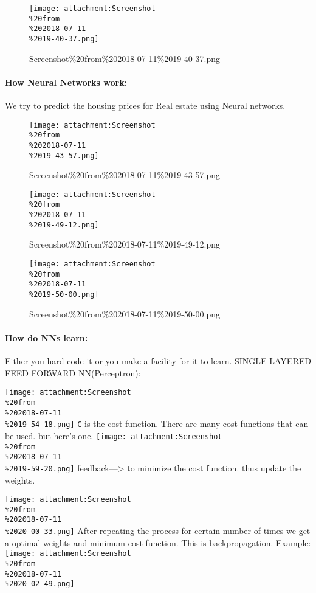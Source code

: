 \documentclass[11pt]{article}
\makeatletter
\def\maxwidth{\ifdim\Gin@nat@width>\linewidth\linewidth
    \else\Gin@nat@width\fi}
\let\Oldincludegraphics\includegraphics
\renewcommand{\includegraphics}[1]{\Oldincludegraphics[width=.8\maxwidth]{#1}}
\makeatother
\begin{document}
\begin{figure}
\centering
\texttt{[image: attachment:Screenshot\\\%20from\\\%202018-07-11\\\%2019-40-37.png]}
\caption{Screenshot\%20from\%202018-07-11\%2019-40-37.png}
\end{figure}

\hypertarget{how-neural-networks-work}{%
\paragraph{How Neural Networks work:}\label{how-neural-networks-work}}

We try to predict the housing prices for Real estate using Neural
networks.

\begin{figure}
\centering
\texttt{[image: attachment:Screenshot\\\%20from\\\%202018-07-11\\\%2019-43-57.png]}
\caption{Screenshot\%20from\%202018-07-11\%2019-43-57.png}
\end{figure}

\begin{figure}
\centering
\texttt{[image: attachment:Screenshot\\\%20from\\\%202018-07-11\\\%2019-49-12.png]}
\caption{Screenshot\%20from\%202018-07-11\%2019-49-12.png}
\end{figure}

\begin{figure}
\centering
\texttt{[image: attachment:Screenshot\\\%20from\\\%202018-07-11\\\%2019-50-00.png]}
\caption{Screenshot\%20from\%202018-07-11\%2019-50-00.png}
\end{figure}

\hypertarget{how-do-nns-learn}{%
\paragraph{How do NNs learn:}\label{how-do-nns-learn}}

Either you hard code it or you make a facility for it to learn. SINGLE
LAYERED FEED FORWARD NN(Perceptron):

\texttt{[image: attachment:Screenshot\\\%20from\\\%202018-07-11\\\%2019-54-18.png]}
\texttt{C} is the cost function. There are many cost functions that can
be used. but here's one.
\texttt{[image: attachment:Screenshot\\\%20from\\\%202018-07-11\\\%2019-59-20.png]}
feedback---\textgreater{} to minimize the cost function. thus update the
weights.

\texttt{[image: attachment:Screenshot\\\%20from\\\%202018-07-11\\\%2020-00-33.png]}
After repeating the process for certain number of times we get a optimal
weights and minimum cost function. This is backpropagation. Example:
\texttt{[image: attachment:Screenshot\\\%20from\\\%202018-07-11\\\%2020-02-49.png]}
\end{document}
